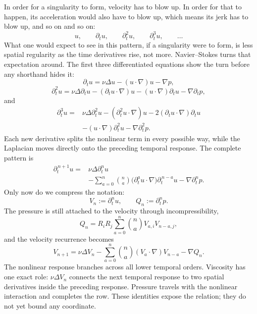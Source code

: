 \documentclass[11pt]{article}
\begin{document}
In order for a singularity to form, velocity has to blow up. In order for that to happen, its acceleration would also have to blow up, which means its jerk has to blow up, and so on and so on:
\[
u,\qquad \partial_tu,\qquad \partial_t^2u,\qquad \partial_t^3u,\qquad\ldots
\]
What one would expect to see in this pattern, if a singularity were to form, is less spatial regularity as the time derivatives rise, not more. Navier--Stokes turns that expectation around. The first three differentiated equations show the turn before any shorthand hides it:
\[
\partial_tu
=\nu\Delta u-(u\cdot\nabla)u-\nabla p,
\]
\[
\partial_t^2u
=\nu\Delta\partial_tu
-(\partial_tu\cdot\nabla)u
-(u\cdot\nabla)\partial_tu
-\nabla\partial_tp,
\]
and
\[
\begin{aligned}
\partial_t^3u={}&\nu\Delta\partial_t^2u
-(\partial_t^2u\cdot\nabla)u
-2(\partial_tu\cdot\nabla)\partial_tu \\
&-(u\cdot\nabla)\partial_t^2u
-\nabla\partial_t^2p.
\end{aligned}
\]
Each new derivative splits the nonlinear term in every possible way, while the Laplacian moves directly onto the preceding temporal response. The complete pattern is
\[
\begin{aligned}
\partial_t^{\,n+1}u={}&\nu\Delta\partial_t^n u \\
&-\sum_{a=0}^{n}\binom{n}{a}
\bigl(\partial_t^a u\cdot\nabla\bigr)
\partial_t^{\,n-a}u
-\nabla\partial_t^n p.
\end{aligned}
\]
Only now do we compress the notation:
\[
V_n:=\partial_t^n u,
\qquad
Q_n:=\partial_t^n p.
\]
The pressure is still attached to the velocity through incompressibility,
\[
Q_n
=R_iR_j\sum_{a=0}^{n}\binom{n}{a}
V_{a,i}V_{n-a,j},
\]
and the velocity recurrence becomes
\[
V_{n+1}
=\nu\Delta V_n
-\sum_{a=0}^{n}\binom{n}{a}(V_a\cdot\nabla)V_{n-a}
-\nabla Q_n.
\]
The nonlinear response branches across all lower temporal orders. Viscosity has one exact role: \(\nu\Delta V_n\) connects the next temporal response to two spatial derivatives inside the preceding response. Pressure travels with the nonlinear interaction and completes the row. These identities expose the relation; they do not yet bound any coordinate.
\end{document}
